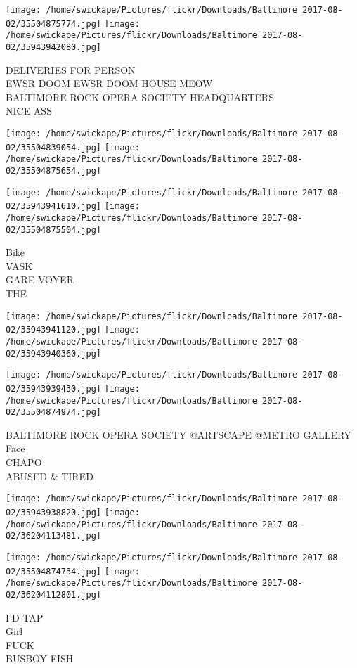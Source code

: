 \documentclass[10pt,letterpaper]{article}
\begin{document}
\texttt{[image: /home/swickape/Pictures/flickr/Downloads/Baltimore 2017-08-02/35504875774.jpg]}
\texttt{[image: /home/swickape/Pictures/flickr/Downloads/Baltimore 2017-08-02/35943942080.jpg]}

DELIVERIES FOR PERSON\\
EWSR DOOM EWSR DOOM HOUSE MEOW\\
BALTIMORE ROCK OPERA SOCIETY HEADQUARTERS\\
NICE ASS
\pagebreak

\texttt{[image: /home/swickape/Pictures/flickr/Downloads/Baltimore 2017-08-02/35504839054.jpg]}
\texttt{[image: /home/swickape/Pictures/flickr/Downloads/Baltimore 2017-08-02/35504875654.jpg]}

\texttt{[image: /home/swickape/Pictures/flickr/Downloads/Baltimore 2017-08-02/35943941610.jpg]}
\texttt{[image: /home/swickape/Pictures/flickr/Downloads/Baltimore 2017-08-02/35504875504.jpg]}

Bike\\
VASK\\
GARE VOYER\\
THE
\pagebreak

\texttt{[image: /home/swickape/Pictures/flickr/Downloads/Baltimore 2017-08-02/35943941120.jpg]}
\texttt{[image: /home/swickape/Pictures/flickr/Downloads/Baltimore 2017-08-02/35943940360.jpg]}

\texttt{[image: /home/swickape/Pictures/flickr/Downloads/Baltimore 2017-08-02/35943939430.jpg]}
\texttt{[image: /home/swickape/Pictures/flickr/Downloads/Baltimore 2017-08-02/35504874974.jpg]}

BALTIMORE ROCK OPERA SOCIETY @ARTSCAPE @METRO GALLERY\\
Face\\
CHAPO\\
ABUSED \& TIRED
\pagebreak

\texttt{[image: /home/swickape/Pictures/flickr/Downloads/Baltimore 2017-08-02/35943938820.jpg]}
\texttt{[image: /home/swickape/Pictures/flickr/Downloads/Baltimore 2017-08-02/36204113481.jpg]}

\texttt{[image: /home/swickape/Pictures/flickr/Downloads/Baltimore 2017-08-02/35504874734.jpg]}
\texttt{[image: /home/swickape/Pictures/flickr/Downloads/Baltimore 2017-08-02/36204112801.jpg]}

I'D TAP\\
Girl\\
FUCK\\
BUSBOY FISH
\pagebreak
\end{document}
